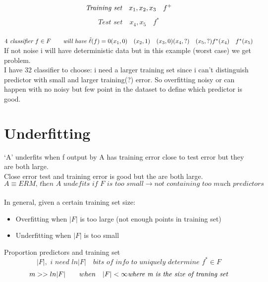 \documentclass[../main.tex]{subfiles}
\begin{document}
\\\\
\[
\textit{Training set} \quad {x_1,x_2,x_3} \quad f^+
\\
\]
\[
\textit{Test set} \quad {x_4,x_5} \quad f^* 
\]
\\
$
4 \textit{ classifier } f \in F \qquad \textit{will have } \hat{\ell}(f) = 0
\\\\
	(x_1,0) \quad (x_2,1) \quad (x_3,0) \\
	(x_4,?) \quad (x_5, ?) \\
	f^*(x_4) \quad f^*(x_5)
$
\\
If not noise i will have deterministic data but in this example (worst case) we
get problem.\\
I have 32 classifier to choose: i need a larger training set since i can’t
distinguish predictor with small and larger training(?) error.
So overfitting noisy or can happen with no noisy but few point in the dataset to
define which predictor is good.\\



\section{Underfitting}
‘A’ underfits when f output by A has training error close to test error but they
are both large.\\
Close error test and training error is good but the are both large.
\\
$$
A \equiv ERM  \textit{, then A undefits if F is too small} \rightarrow \textit{not containing too much predictors}
$$
\\
In general, given a certain training set size:
\begin{itemize}
\item Overfitting when $|F|$ is too large (not enough points in training set)
\item Underfitting when $|F|$ is too small
\end{itemize}
Proportion predictors and training set
\\
$$
|F|, \textit{ i need } ln |F| \quad \textit{bits of info to uniquely determine } f^* \in  F
$$
$$
m >> ln |F| \qquad when \quad |F| < \infty \textit{\\ where m is the size of traning set}
$$
\\
\end{document}
